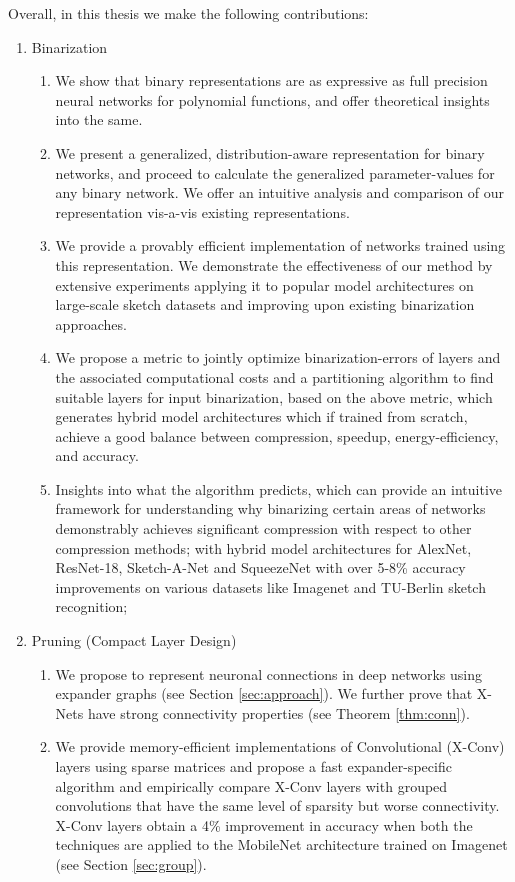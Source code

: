 Overall, in this thesis we make the following contributions: 
\begin{enumerate}
\item Binarization
\begin{enumerate}
\item We show that binary representations are as expressive as full precision neural networks for polynomial functions, and offer theoretical insights into the same. 
\item We present a generalized, distribution-aware representation for binary networks, and proceed to calculate the generalized parameter-values for any binary network. We offer an intuitive analysis and comparison of our representation vis-a-vis existing representations.
\item We provide a provably efficient implementation of networks trained using this representation. We demonstrate the effectiveness of our method by extensive experiments applying it to popular model architectures on large-scale sketch datasets and improving upon existing binarization approaches.
\item We propose a metric to jointly optimize binarization-errors of layers and the associated computational costs and a partitioning algorithm to find suitable layers for input binarization, based on the above metric, which generates hybrid model architectures which if trained from scratch, achieve a good balance between compression, speedup, energy-efficiency, and accuracy.
\item Insights into what the algorithm predicts, which can provide an intuitive framework for understanding why binarizing certain areas of networks demonstrably achieves significant compression with respect to other compression methods; with hybrid model architectures for AlexNet, ResNet-18, Sketch-A-Net and SqueezeNet with over 5-8\% accuracy improvements on various datasets like Imagenet and TU-Berlin sketch recognition;
\end{enumerate}
\item Pruning (Compact Layer Design)
\begin{enumerate}
\item We propose to represent neuronal connections in deep networks using expander graphs (see Section \ref{sec:approach}). We further prove that X-Nets have strong connectivity properties (see Theorem \ref{thm:conn}).
\item We provide memory-efficient implementations of  Convolutional (X-Conv) layers using sparse matrices and propose a fast expander-specific algorithm and empirically compare X-Conv layers with grouped convolutions that have the same level of sparsity but worse connectivity. X-Conv layers obtain a 4\% improvement in accuracy when both the techniques are applied to the MobileNet architecture trained on Imagenet (see Section \ref{sec:group}).

\end{enumerate}
\end{enumerate}
